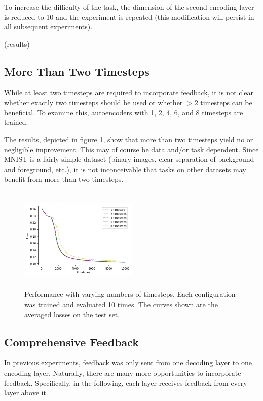 \documentclass{article}
\begin{document}
To increase the difficulty of the task, the dimension of the second encoding layer is reduced to 10 and the experiment is repeated (this modification will persist in all subsequent experiments).

(results) 

\subsection{More Than Two Timesteps}
\label{timesteps}
While at least two timesteps are required to incorporate feedback, it is not clear whether exactly two timesteps should be used or whether $>2$ timesteps can be beneficial. To examine this, autoencoders with 1, 2, 4, 6, and 8 timesteps are trained. 

The results, depicted in figure \ref{fig:timesteps}, show that more than two timesteps yield no or negligible improvement. This may of course be data and/or task dependent. Since MNIST is a fairly simple dataset (binary images, clear separation of background and foreground, etc.), it is not inconceivable that tasks on other datasets may benefit from more than two timesteps. 




\begin{figure}
      \centering
      \includegraphics[width=0.5\textwidth,height=5cm,keepaspectratio]{img/timesteps_test.png}
      \caption{Performance with varying numbers of timesteps. Each configuration was trained and evaluated 10 times. The curves shown are the averaged losses on the test set.}
      \label{fig:timesteps}
  \end{figure}
 
 
\subsection{Comprehensive Feedback}
In previous experiments, feedback was only sent from one decoding layer to one encoding layer. Naturally, there are many more opportunities to incorporate feedback. Specifically, in the following, each layer receives feedback from every layer above it.
\end{document}
